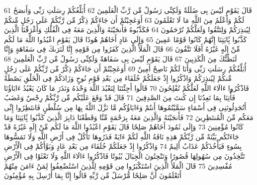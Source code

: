 \documentclass[20pt,a4paper]{article}
\begin{document}
{\tiny\colorbox{cl_aya}{61}} قَالَ يَقَوْمِ لَيْسَ بِى ضَلَلَةٌ وَلَكِنِّى رَسُولٌ مِّن رَّبِّ الْعَلَمِينَ
{\tiny\colorbox{cl_aya}{62}} أُبَلِّغُكُمْ رِسَلَتِ رَبِّى وَأَنصَحُ لَكُمْ وَأَعْلَمُ مِنَ اللَّهِ مَا لَا تَعْلَمُونَ
{\tiny\colorbox{cl_aya}{63}} أَوَعَجِبْتُمْ أَن جَاءَكُمْ ذِكْرٌ مِّن رَّبِّكُمْ عَلَى رَجُلٍ مِّنكُمْ لِيُنذِرَكُمْ وَلِتَتَّقُوا وَلَعَلَّكُمْ تُرْحَمُونَ
{\tiny\colorbox{cl_aya}{64}} فَكَذَّبُوهُ فَأَنجَيْنَهُ وَالَّذِينَ مَعَهُ فِى الْفُلْكِ وَأَغْرَقْنَا الَّذِينَ كَذَّبُوا بَِٔايَتِنَا إِنَّهُمْ كَانُوا قَوْمًا عَمِينَ
{\tiny\colorbox{cl_aya}{65}} وَإِلَى عَادٍ أَخَاهُمْ هُودًا قَالَ يَقَوْمِ اعْبُدُوا اللَّهَ مَا لَكُم مِّنْ إِلَهٍ غَيْرُهُ أَفَلَا تَتَّقُونَ
{\tiny\colorbox{cl_aya}{66}} قَالَ الْمَلَأُ الَّذِينَ كَفَرُوا مِن قَوْمِهِ إِنَّا لَنَرَىكَ فِى سَفَاهَةٍ وَإِنَّا لَنَظُنُّكَ مِنَ الْكَذِبِينَ
{\tiny\colorbox{cl_aya}{67}} قَالَ يَقَوْمِ لَيْسَ بِى سَفَاهَةٌ وَلَكِنِّى رَسُولٌ مِّن رَّبِّ الْعَلَمِينَ
{\tiny\colorbox{cl_aya}{68}} أُبَلِّغُكُمْ رِسَلَتِ رَبِّى وَأَنَا لَكُمْ نَاصِحٌ أَمِينٌ
{\tiny\colorbox{cl_aya}{69}} أَوَعَجِبْتُمْ أَن جَاءَكُمْ ذِكْرٌ مِّن رَّبِّكُمْ عَلَى رَجُلٍ مِّنكُمْ لِيُنذِرَكُمْ وَاذْكُرُوا إِذْ جَعَلَكُمْ خُلَفَاءَ مِن بَعْدِ قَوْمِ نُوحٍ وَزَادَكُمْ فِى الْخَلْقِ بَصْطَةً فَاذْكُرُوا ءَالَاءَ اللَّهِ لَعَلَّكُمْ تُفْلِحُونَ
{\tiny\colorbox{cl_aya}{70}} قَالُوا أَجِئْتَنَا لِنَعْبُدَ اللَّهَ وَحْدَهُ وَنَذَرَ مَا كَانَ يَعْبُدُ ءَابَاؤُنَا فَأْتِنَا بِمَا تَعِدُنَا إِن كُنتَ مِنَ الصَّدِقِينَ
{\tiny\colorbox{cl_aya}{71}} قَالَ قَدْ وَقَعَ عَلَيْكُم مِّن رَّبِّكُمْ رِجْسٌ وَغَضَبٌ أَتُجَدِلُونَنِى فِى أَسْمَاءٍ سَمَّيْتُمُوهَا أَنتُمْ وَءَابَاؤُكُم مَّا نَزَّلَ اللَّهُ بِهَا مِن سُلْطَنٍ فَانتَظِرُوا إِنِّى مَعَكُم مِّنَ الْمُنتَظِرِينَ
{\tiny\colorbox{cl_aya}{72}} فَأَنجَيْنَهُ وَالَّذِينَ مَعَهُ بِرَحْمَةٍ مِّنَّا وَقَطَعْنَا دَابِرَ الَّذِينَ كَذَّبُوا بَِٔايَتِنَا وَمَا كَانُوا مُؤْمِنِينَ
{\tiny\colorbox{cl_aya}{73}} وَإِلَى ثَمُودَ أَخَاهُمْ صَلِحًا قَالَ يَقَوْمِ اعْبُدُوا اللَّهَ مَا لَكُم مِّنْ إِلَهٍ غَيْرُهُ قَدْ جَاءَتْكُم بَيِّنَةٌ مِّن رَّبِّكُمْ هَذِهِ نَاقَةُ اللَّهِ لَكُمْ ءَايَةً فَذَرُوهَا تَأْكُلْ فِى أَرْضِ اللَّهِ وَلَا تَمَسُّوهَا بِسُوءٍ فَيَأْخُذَكُمْ عَذَابٌ أَلِيمٌ
{\tiny\colorbox{cl_aya}{74}} وَاذْكُرُوا إِذْ جَعَلَكُمْ خُلَفَاءَ مِن بَعْدِ عَادٍ وَبَوَّأَكُمْ فِى الْأَرْضِ تَتَّخِذُونَ مِن سُهُولِهَا قُصُورًا وَتَنْحِتُونَ الْجِبَالَ بُيُوتًا فَاذْكُرُوا ءَالَاءَ اللَّهِ وَلَا تَعْثَوْا فِى الْأَرْضِ مُفْسِدِينَ
{\tiny\colorbox{cl_aya}{75}} قَالَ الْمَلَأُ الَّذِينَ اسْتَكْبَرُوا مِن قَوْمِهِ لِلَّذِينَ اسْتُضْعِفُوا لِمَنْ ءَامَنَ مِنْهُمْ أَتَعْلَمُونَ أَنَّ صَلِحًا مُّرْسَلٌ مِّن رَّبِّهِ قَالُوا إِنَّا بِمَا أُرْسِلَ بِهِ مُؤْمِنُونَ
\end{document}
